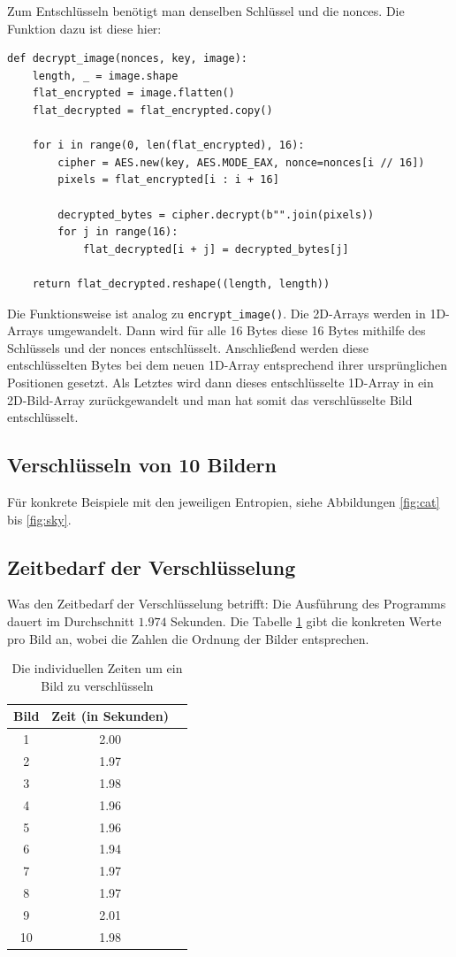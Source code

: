 Zum Entschlüsseln benötigt man denselben Schlüssel und die nonces. Die Funktion dazu ist diese hier:
\begin{lstlisting}
def decrypt_image(nonces, key, image):
    length, _ = image.shape
    flat_encrypted = image.flatten()
    flat_decrypted = flat_encrypted.copy()

    for i in range(0, len(flat_encrypted), 16):
        cipher = AES.new(key, AES.MODE_EAX, nonce=nonces[i // 16])
        pixels = flat_encrypted[i : i + 16]

        decrypted_bytes = cipher.decrypt(b"".join(pixels))
        for j in range(16):
            flat_decrypted[i + j] = decrypted_bytes[j]

    return flat_decrypted.reshape((length, length))
\end{lstlisting}
Die Funktionsweise ist analog zu \lstinline{encrypt_image()}. Die 2D-Arrays werden in 1D-Arrays umgewandelt. Dann wird für alle
16 Bytes diese 16 Bytes mithilfe des Schlüssels und der nonces entschlüsselt. Anschließend werden diese entschlüsselten Bytes
bei dem neuen 1D-Array entsprechend ihrer ursprünglichen Positionen gesetzt. Als Letztes wird dann dieses entschlüsselte 1D-Array
in ein 2D-Bild-Array zurückgewandelt und man hat somit das verschlüsselte Bild entschlüsselt.

\subsection{Verschlüsseln von 10 Bildern}
Für konkrete Beispiele mit den jeweiligen Entropien, siehe Abbildungen \ref{fig:cat} bis \ref{fig:sky}.

\subsection{Zeitbedarf der Verschlüsselung}
Was den Zeitbedarf der Verschlüsselung betrifft: Die Ausführung des Programms dauert im Durchschnitt
$1.974$ Sekunden. Die Tabelle \ref{tab:speed3} gibt die konkreten Werte pro Bild an, wobei die Zahlen
die Ordnung der Bilder entsprechen.
\begin{table}
	\begin{center}
		\begin{tabular}{ |c|c|c| } 
		\hline
		Bild & Zeit (in Sekunden) \\
		\hline
		1 & 2.00 \\
		2 & 1.97\\
		3 & 1.98\\
		4 & 1.96\\
		5 & 1.96\\
		6 & 1.94\\
		7 & 1.97\\
		8 & 1.97\\
		9 & 2.01\\
		10 & 1.98\\
		\hline
		\end{tabular}
	\end{center}
	\caption{Die individuellen Zeiten um ein Bild zu verschlüsseln}
	\label{tab:speed3}
\end{table}

